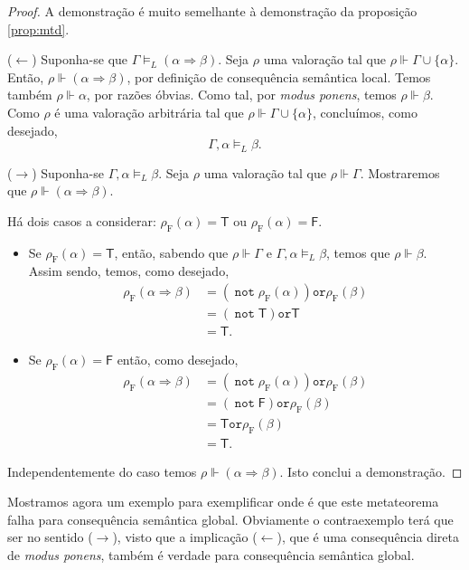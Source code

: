 \documentclass{report}
\theoremstyle{definition}
\theoremstyle{remark}
\newcommand{\F}{\mathrm{F}}
\newcommand{\lt}{\mathsf{T}}
\newcommand{\lf}{\mathsf{F}}
\DeclareMathOperator{\pnot}{\texttt{not}}
\newcommand{\por}{\mathbin{\texttt{or}}}
\newcommand{\imply}{\mathbin{\Rightarrow}}
\begin{document}
	\begin{proof}
	A demonstração é muito semelhante à demonstração da proposição \ref{prop:mtd}.
	
	($\leftarrow$) Suponha-se que $\Gamma \vDash_L (\alpha \imply \beta)$. Seja $\rho$ uma valoração tal que $\rho \Vdash \Gamma \cup \{\alpha\}$. Então, $\rho \Vdash (\alpha \imply \beta)$, por definição de consequência semântica local. Temos também $\rho \Vdash \alpha$, por razões óbvias. Como tal, por \textit{modus ponens}, temos $\rho \Vdash \beta$. Como $\rho$ é uma valoração arbitrária tal que $\rho \Vdash \Gamma \cup \{\alpha\}$, concluímos, como desejado,
	\[\Gamma, \alpha \vDash_L \beta.\]
	
	($\rightarrow$) Suponha-se $\Gamma, \alpha \vDash_L \beta$. Seja $\rho$ uma valoração tal que $\rho \Vdash \Gamma$. Mostraremos que $\rho \Vdash (\alpha \imply \beta)$.
	
	Há dois casos a considerar: $\rho_\F(\alpha) = \lt$ ou $\rho_\F(\alpha) = \lf$.
	
	\begin{itemize}
	\item Se $\rho_\F(\alpha) = \lt$, então, sabendo que $\rho \Vdash \Gamma$ e  $\Gamma, \alpha \vDash_L \beta$, temos que $\rho \Vdash \beta$. Assim sendo, temos, como desejado,
	\begin{align*}
	\rho_\F(\alpha \imply \beta) &= (\pnot \rho_\F(\alpha)) \por \rho_\F(\beta)\\
	&= (\pnot \lt) \por \lt\\
	&= \lt.
	\end{align*}
	
	\item Se $\rho_\F(\alpha) = \lf$ então, como desejado,
	\begin{align*}
	\rho_\F(\alpha \imply \beta) &= (\pnot \rho_\F(\alpha)) \por \rho_\F(\beta)\\
	&= (\pnot \lf) \por \rho_\F(\beta)\\
	&= \lt \por \rho_\F(\beta)\\
	&= \lt.
	\end{align*}
	\end{itemize}
	
	Independentemente do caso temos $\rho \Vdash (\alpha \imply \beta)$. Isto conclui a demonstração.
	\end{proof}
	
	Mostramos agora um exemplo para exemplificar onde é que este metateorema falha para consequência semântica global. Obviamente o contraexemplo terá que ser no sentido ($\rightarrow$), visto que a implicação ($\leftarrow$), que é uma consequência direta de \textit{modus ponens}, também é verdade para consequência semântica global.
	
\end{document}
